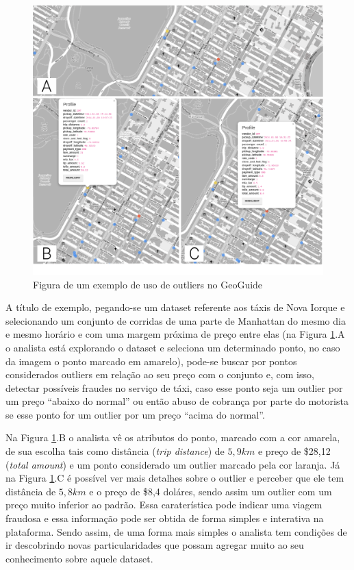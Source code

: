 \begin{figure}[t]
	\centering
	\includegraphics[width=\textwidth]{images/outliers-geoguide.png}
	\caption{Figura de um exemplo de uso de outliers no GeoGuide}
	\label{fig:outliers-geoguide}
	\vspace{-10pt}
\end{figure}

A título de exemplo, pegando-se um dataset referente aos táxis de Nova Iorque e selecionando um conjunto de corridas de uma parte de Manhattan do mesmo dia e mesmo horário e com uma margem próxima de preço entre elas (na Figura \ref{fig:outliers-geoguide}.A o analista está explorando o dataset e seleciona um determinado ponto, no caso da imagem o ponto marcado em amarelo), pode-se buscar por pontos considerados outliers em relação ao seu preço com o conjunto e, com isso, detectar possíveis fraudes no serviço de táxi, caso esse ponto seja um outlier por um preço ``abaixo do normal'' ou então abuso de cobrança por parte do motorista se esse ponto for um outlier por um preço ``acima do normal''.

Na Figura \ref{fig:outliers-geoguide}.B o analista vê os atributos do ponto, marcado com a cor amarela, de sua escolha tais como distância (\textit{trip distance}) de $5,9km$ e preço de \$28,12  (\textit{total amount}) e um ponto considerado um outlier marcado pela cor laranja. Já na Figura \ref{fig:outliers-geoguide}.C é possível ver mais detalhes sobre o outlier e perceber que ele tem distância de $5,8km$ e o preço de \$8,4 doláres, sendo assim um outlier com um preço muito inferior ao padrão. Essa caraterística pode indicar uma viagem fraudosa e essa informação pode ser obtida de forma simples e interativa na plataforma. Sendo assim, de uma forma mais simples o analista tem condições de ir descobrindo novas particularidades que possam agregar muito ao seu conhecimento sobre aquele dataset.

